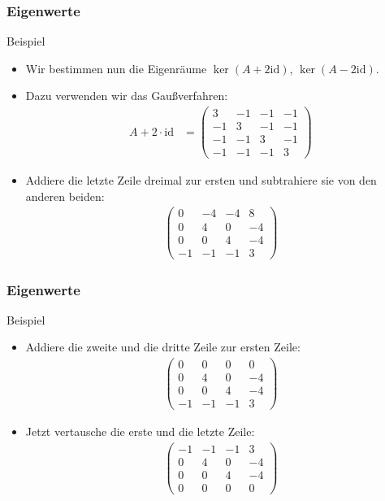 \documentclass{beamer}
\newcommand{\id}{\mathrm{id}}
\renewcommand{\ae}{\"a}
\newcommand{\mytitle}{Eigenwerte}
\begin{document}
\begin{frame}\frametitle{\mytitle}
	\begin{block}{Beispiel}
	\begin{itemize}
		\item Wir bestimmen nun die Eigenr\ae ume $\ker(A+2\id)$, $\ker(A-2\id)$.
		\item Dazu verwenden wir das Gau\ss verfahren:
			\begin{align*}
				A+2\cdot\id&= \begin{pmatrix} 3&-1&-1&-1\\-1&3&-1&-1\\-1&-1&3&-1\\-1&-1&-1&3
				\end{pmatrix}
			\end{align*}
		\item Addiere die letzte Zeile dreimal zur ersten und subtrahiere sie von den anderen beiden:
\begin{align*}
				 \begin{pmatrix} 0&-4&-4&8\\0&4&0&-4\\0&0&4&-4\\-1&-1&-1&3
				\end{pmatrix}
			\end{align*}
	\end{itemize}
	\end{block}
\end{frame}

\begin{frame}\frametitle{\mytitle}
	\begin{block}{Beispiel}
	\begin{itemize}
		\item Addiere die zweite und die dritte Zeile zur ersten Zeile:
\begin{align*}
				 \begin{pmatrix} 0&0&0&0\\0&4&0&-4\\0&0&4&-4\\-1&-1&-1&3
				\end{pmatrix}
			\end{align*}
		\item Jetzt vertausche die erste und die letzte Zeile:
\begin{align*}
				 \begin{pmatrix}-1&-1&-1&3 \\0&4&0&-4\\0&0&4&-4\\0&0&0&0				\end{pmatrix}
			\end{align*}
	\end{itemize}
	\end{block}
\end{frame}
\end{document}
